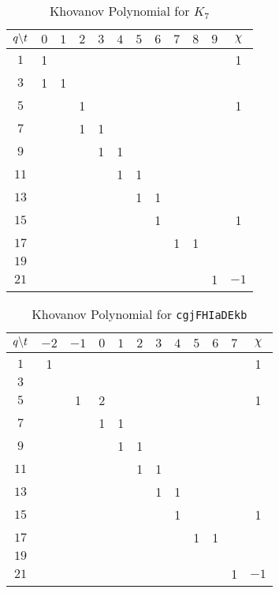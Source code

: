 \documentclass{article}
\theoremstyle{plain}
\begin{document}
        \begin{table}[H]
            \centering
            \begin{tabular}{| c | c | c | c | c | c | c | c | c | c | c | c |}
                \hline
                $q\symbol{92}t$&$0$&$1$&$2$&$3$&$4$&$5$&$6$&$7$&$8$&$9$&$\chi$\\
                \hline
                $1$&1&&&&&&&&&&1\\
                \hline
                $3$&1&1&&&&&&&&&\\
                \hline
                $5$&&&1&&&&&&&&1\\
                \hline
                $7$&&&1&1&&&&&&&\\
                \hline
                $9$&&&&1&1&&&&&&\\
                \hline
                $11$&&&&&1&1&&&&&\\
                \hline
                $13$&&&&&&1&1&&&&\\
                \hline
                $15$&&&&&&&1&&&&1\\
                \hline
                $17$&&&&&&&&1&1&&\\
                \hline
                $19$&&&&&&&&&&&\\
                \hline
                $21$&&&&&&&&&&1&$-1$\\
                \hline
            \end{tabular}
            \caption{Khovanov Polynomial for $K_{7}$}
            \label{table:m_7_kho}
        \end{table}
        \begin{table}[H]
            \centering
            \begin{tabular}{| c | c | c | c | c | c | c | c | c | c | c | c |}
                \hline
                $q\symbol{92}t$&$-2$&$-1$&$0$&$1$&$2$&$3$&$4$&$5$&$6$&$7$&$\chi$\\
                \hline
                $1$&1&&&&&&&&&&1\\
                \hline
                $3$&&&&&&&&&&&\\
                \hline
                $5$&&1&2&&&&&&&&1\\
                \hline
                $7$&&&1&1&&&&&&&\\
                \hline
                $9$&&&&1&1&&&&&&\\
                \hline
                $11$&&&&&1&1&&&&&\\
                \hline
                $13$&&&&&&1&1&&&&\\
                \hline
                $15$&&&&&&&1&&&&1\\
                \hline
                $17$&&&&&&&&1&1&&\\
                \hline
                $19$&&&&&&&&&&&\\
                \hline
                $21$&&&&&&&&&&1&$-1$\\
                \hline
            \end{tabular}
            \caption{Khovanov Polynomial for \texttt{cgjFHIaDEkb}}
            \label{table:cgjFHIaDEkb_kho}
        \end{table}
\end{document}
